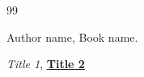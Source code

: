 \documentclass{article}
\begin{document}
\lstlistoflistings
{} 




























\begin{thebibliography}{99}


Author name, Book name.

\emph{Title 1},
\href{https://www.overleaf.com/learn/latex/Bibliography_management_with_bibtex}{\textbf{Title 2}}




\end{thebibliography}
\end{document}
